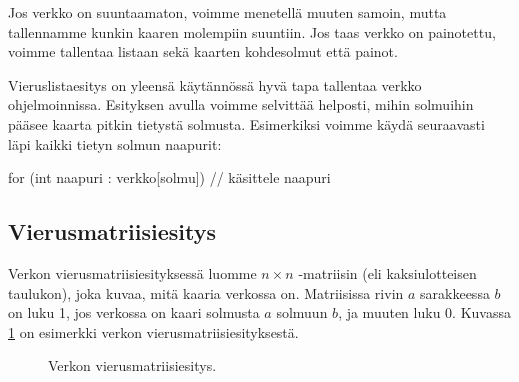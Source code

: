 Jos verkko on suuntaamaton, voimme menetellä muuten samoin,
mutta tallennamme kunkin kaaren molempiin suuntiin.
Jos taas verkko on painotettu, voimme tallentaa listaan
sekä kaarten kohdesolmut että painot.

Vieruslistaesitys on yleensä käytännössä hyvä tapa
tallentaa verkko ohjelmoinnissa.
Esityksen avulla voimme selvittää helposti,
mihin solmuihin pääsee kaarta pitkin tietystä solmusta.
Esimerkiksi voimme käydä seuraavasti läpi
kaikki tietyn solmun naapurit:

\begin{code}
for (int naapuri : verkko[solmu]) {
    // käsittele naapuri
}
\end{code}

\subsection{Vierusmatriisiesitys}

Verkon vierusmatriisiesityksessä luomme $n \times n$ -matriisin
(eli kaksiulotteisen taulukon), joka kuvaa, mitä kaaria verkossa on.
Matriisissa rivin $a$ sarakkeessa $b$ on luku 1,
jos verkossa on kaari solmusta $a$ solmuun $b$,
ja muuten luku 0.
Kuvassa \ref{fig:vervil} on esimerkki verkon
vierusmatriisiesityksestä.

\begin{figure}
\center
\begin{center}
\end{center}
\caption{Verkon vierusmatriisiesitys.}
\label{fig:vervil}
\end{figure}

